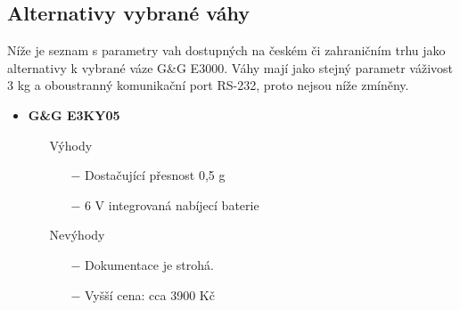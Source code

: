 \subsection{Alternativy vybrané váhy}
Níže je seznam s parametry vah dostupných na českém či zahraničním trhu jako alternativy k vybrané váze G\&G E3000. Váhy mají jako stejný parametr váživost 3 kg a oboustranný komunikační port RS-232, proto nejsou níže zmíněny.
\begin{itemize}
    
    \item \textbf{G\&G E3KY05}
    \begin{itemize}
        \item[] Výhody
        \begin{itemize}
            \item[$-$] Dostačující přesnost 0,5 g
            \item[$-$] 6 V integrovaná nabíjecí baterie
        \end{itemize}
        \item[] Nevýhody
        \begin{itemize}
            \item[$-$] Dokumentace je strohá.
            \item[$-$] Vyšší cena: cca 3900 Kč
        \end{itemize}
    \end{itemize}
    

\end{itemize}
